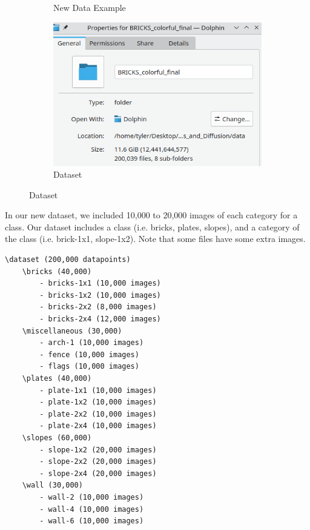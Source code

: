 \documentclass[]{article}
\begin{document}
\begin{figure}[h]
\begin{subfigure}[b]{0.2\textwidth}
        \caption{New Data Example}
    \end{subfigure}
    \begin{subfigure}[b]{0.4\textwidth}
        \centering
        \includegraphics[width=\textwidth]{dataset.png}
        \caption{Dataset}
    \end{subfigure}\par\medskip
\end{figure}

In our new dataset, we included 10,000 to 20,000 images of each category for a class. Our dataset includes a class (i.e. bricks, plates, slopes), and a category of the class (i.e. brick-1x1, slope-1x2). Note that some files have some extra images.
\begin{verbatim}
\dataset (200,000 datapoints)
    \bricks (40,000)
        - bricks-1x1 (10,000 images)
        - bricks-1x2 (10,000 images)
        - bricks-2x2 (8,000 images)
        - bricks-2x4 (12,000 images)
    \miscellaneous (30,000)
        - arch-1 (10,000 images)
        - fence (10,000 images)
        - flags (10,000 images)
    \plates (40,000)
        - plate-1x1 (10,000 images)
        - plate-1x2 (10,000 images)
        - plate-2x2 (10,000 images)
        - plate-2x4 (10,000 images)
    \slopes (60,000)
        - slope-1x2 (20,000 images)
        - slope-2x2 (20,000 images)
        - slope-2x4 (20,000 images)
    \wall (30,000)
        - wall-2 (10,000 images)
        - wall-4 (10,000 images)
        - wall-6 (10,000 images)
\end{verbatim}
\end{document}
